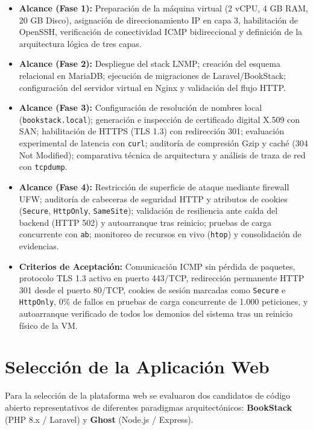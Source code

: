 \documentclass[12pt,a4paper]{article}
\begin{document}
\begin{itemize}[leftmargin=1.5em, itemsep=3pt]
    \item \textbf{Alcance (Fase 1):} Preparación de la máquina virtual (2 vCPU, 4 GB RAM, 20 GB Disco), asignación de direccionamiento IP en capa 3, habilitación de OpenSSH, verificación de conectividad ICMP bidireccional y definición de la arquitectura lógica de tres capas.
    \item \textbf{Alcance (Fase 2):} Despliegue del stack LNMP; creación del esquema relacional en MariaDB; ejecución de migraciones de Laravel/BookStack; configuración del servidor virtual en Nginx y validación del flujo HTTP.
    \item \textbf{Alcance (Fase 3):} Configuración de resolución de nombres local (\texttt{bookstack.local}); generación e inspección de certificado digital X.509 con SAN; habilitación de HTTPS (TLS 1.3) con redirección 301; evaluación experimental de latencia con \texttt{curl}; auditoría de compresión Gzip y caché (304 Not Modified); comparativa técnica de arquitectura y análisis de traza de red con \texttt{tcpdump}.
    \item \textbf{Alcance (Fase 4):} Restricción de superficie de ataque mediante firewall UFW; auditoría de cabeceras de seguridad HTTP y atributos de cookies (\texttt{Secure}, \texttt{HttpOnly}, \texttt{SameSite}); validación de resiliencia ante caída del backend (HTTP 502) y autoarranque tras reinicio; pruebas de carga concurrente con \texttt{ab}; monitoreo de recursos en vivo (\texttt{htop}) y consolidación de evidencias.
    \item \textbf{Criterios de Aceptación:} Comunicación ICMP sin pérdida de paquetes, protocolo TLS 1.3 activo en puerto 443/TCP, redirección permanente HTTP 301 desde el puerto 80/TCP, cookies de sesión marcadas como \texttt{Secure} e \texttt{HttpOnly}, 0\% de fallos en pruebas de carga concurrente de 1.000 peticiones, y autoarranque verificado de todos los demonios del sistema tras un reinicio físico de la VM.
\end{itemize}

\section{Selección de la Aplicación Web}

Para la selección de la plataforma web se evaluaron dos candidatos de código abierto representativos de diferentes paradigmas arquitectónicos: \textbf{BookStack} (PHP 8.x / Laravel) y \textbf{Ghost} (Node.js / Express).
\end{document}
